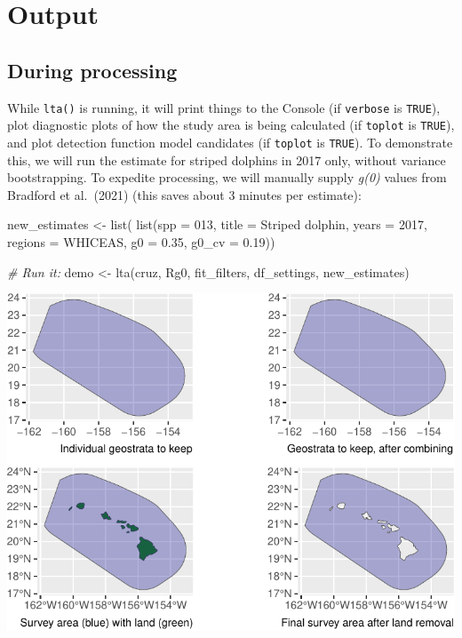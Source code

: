 \documentclass[
]{book}
\newenvironment{Shaded}{\begin{snugshade}}{\end{snugshade}}
\newcommand{\AttributeTok}[1]{\textcolor[rgb]{0.77,0.63,0.00}{#1}}
\newcommand{\CommentTok}[1]{\textcolor[rgb]{0.56,0.35,0.01}{\textit{#1}}}
\newcommand{\DecValTok}[1]{\textcolor[rgb]{0.00,0.00,0.81}{#1}}
\newcommand{\FloatTok}[1]{\textcolor[rgb]{0.00,0.00,0.81}{#1}}
\newcommand{\FunctionTok}[1]{\textcolor[rgb]{0.00,0.00,0.00}{#1}}
\newcommand{\NormalTok}[1]{#1}
\newcommand{\OtherTok}[1]{\textcolor[rgb]{0.56,0.35,0.01}{#1}}
\newcommand{\StringTok}[1]{\textcolor[rgb]{0.31,0.60,0.02}{#1}}
\begin{document}
\hypertarget{output}{%
\section*{Output}\label{output}}

\hypertarget{during-processing}{%
\subsection*{During processing}\label{during-processing}}

While \texttt{lta()} is running, it will print things to the Console (if \texttt{verbose} is \texttt{TRUE}), plot diagnostic plots of how the study area is being calculated (if \texttt{toplot} is \texttt{TRUE}), and plot detection function model candidates (if \texttt{toplot} is \texttt{TRUE}). To demonstrate this, we will run the estimate for striped dolphins in 2017 only, without variance bootstrapping. To expedite processing, we will manually supply \emph{g(0)} values from Bradford et al.~(2021) (this saves about 3 minutes per estimate):

\begin{Shaded}
\begin{Highlighting}[]
\NormalTok{new\_estimates }\OtherTok{\textless{}{-}} \FunctionTok{list}\NormalTok{(}
    \FunctionTok{list}\NormalTok{(}\AttributeTok{spp =} \StringTok{\textquotesingle{}013\textquotesingle{}}\NormalTok{,}
         \AttributeTok{title =} \StringTok{\textquotesingle{}Striped dolphin\textquotesingle{}}\NormalTok{,}
         \AttributeTok{years =} \DecValTok{2017}\NormalTok{,}
         \AttributeTok{regions =} \StringTok{\textquotesingle{}WHICEAS\textquotesingle{}}\NormalTok{,}
         \AttributeTok{g0 =} \FloatTok{0.35}\NormalTok{, }\AttributeTok{g0\_cv =} \FloatTok{0.19}\NormalTok{))}

\CommentTok{\# Run it:}
\NormalTok{demo }\OtherTok{\textless{}{-}} \FunctionTok{lta}\NormalTok{(cruz, Rg0, fit\_filters, df\_settings, new\_estimates)}
\end{Highlighting}
\end{Shaded}

\includegraphics{figures/unnamed-chunk-237-1.pdf}
\end{document}
